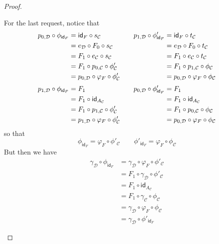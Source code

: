 \documentclass[a4paper,UKenglish,cleveref,pdftex,thm-restate,numberwithinsect]{lipics-v2021}
\newcommand{\id}[1]{\mathsf{id}_{#1}}
\begin{document}
\begin{proof}
\begin{enumerate}
\begin{itemize}
				For the last request, notice that
				\[\begin{split}
					p_{0, \mathcal{D}} \circ \phi_{\id{F}}&= \id{F}\circ s_{\mathcal{C}}\\&= e_{\mathcal{D}}\circ F_0\circ s_{\mathcal{C}}\\&=F_1\circ e_{\mathcal{C}}\circ s_{\mathcal{C}}
					\\&= F_1\circ p_{0, \mathcal{C}}\circ \phi'_{\mathcal{C}}
					\\&=p_{0, \mathcal{D}}\circ \varphi_F\circ \phi'_{\mathcal{C}} \\[.2\baselineskip] 			p_{1, \mathcal{D}} \circ \phi_{\id{F}}&= F_1\\&=F_1\circ \id{A_{\mathcal{C}}}
					\\&= F_1\circ p_{1, \mathcal{C}}\circ \phi'_{\mathcal{C}}
					\\&=p_{1, \mathcal{D}}\circ \varphi_F\circ \phi'_{\mathcal{C}}
				\end{split}\qquad \begin{split}
				p_{1, \mathcal{D}} \circ \phi'_{\id{F}}&= \id{F}\circ t_{\mathcal{C}}\\&= e_{\mathcal{D}}\circ F_0\circ t_{\mathcal{C}}\\&=F_1\circ e_{\mathcal{C}}\circ t_{\mathcal{C}}
				\\&= F_1\circ p_{1, \mathcal{C}}\circ \phi_{\mathcal{C}}
				\\&=p_{0, \mathcal{D}}\circ \varphi_F\circ \phi_{\mathcal{C}}\\[.2\baselineskip] p_{0, \mathcal{D}} \circ \phi'_{\id{F}}&= F_1\\&= F_1 \circ \id{A_{\mathcal{C}}}
				\\&= F_1\circ p_{0, \mathcal{C}}\circ \phi_{\mathcal{C}}
				\\&=p_{0, \mathcal{D}}\circ \varphi_F\circ \phi_{\mathcal{C}}
				\end{split}\]
				so that
				\[\phi_{\id{F}} = \varphi_F \circ \phi'_{\mathcal{C} }\qquad \phi'_{\id{F}} = \varphi_F \circ \phi_{\mathcal{C}}  \]
				But then we have
				\begin{align*}
					\gamma_{\mathcal{D}}\circ \phi_{\id{F}} & = \gamma_{\mathcal{D}}\circ  \varphi_F \circ \phi'_{\mathcal{C} }\\&=F_1\circ \gamma_{\mathcal{D}}\circ \phi'_{\mathcal{C}}\\&=F_1\circ \id{A_{\mathcal{C}}}\\&=F_1\circ \gamma_{\mathcal{C}}\circ \phi_{\mathcal{C}}\\&= \gamma_{\mathcal{D}}\circ \varphi_{F}\circ \phi_{\mathcal{C}}\\&=\gamma_{\mathcal{D}}\circ \phi'_{\id{F}}
				\end{align*}
				

\end{itemize}
\end{enumerate}
\end{proof}
\end{document}
